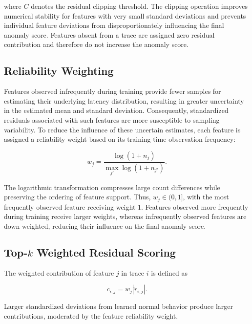 \documentclass[informatics,article,submit,moreauthors]{Definitions/mdpi}
\begin{document}
\noindent where \(C\) denotes the residual clipping threshold. The
clipping operation improves numerical stability for features with very
small standard deviations and prevents individual feature deviations from
disproportionately influencing the final anomaly score. Features absent
from a trace are assigned zero residual contribution and therefore do not
increase the anomaly score.

\subsection{Reliability Weighting}

Features observed infrequently during training provide fewer samples for
estimating their underlying latency distribution, resulting in greater
uncertainty in the estimated mean and standard deviation. Consequently,
standardized residuals associated with such features are more susceptible
to sampling variability. To reduce the influence of these uncertain
estimates, each feature is assigned a reliability weight based on its
training-time observation frequency:

\begin{equation}
	w_j
	=
	\frac{\log(1+n_j)}
	{\max_{j'} \log(1+n_{j'})}.
	\label{eq:weight}
\end{equation}

\noindent The logarithmic transformation compresses large count
differences while preserving the ordering of feature support. Thus,
\(w_j \in (0,1]\), with the most frequently observed feature receiving
weight \(1\). Features observed more frequently during training receive
larger weights, whereas infrequently observed features are down-weighted,
reducing their influence on the final anomaly score.

\subsection{Top-\(k\) Weighted Residual Scoring}

The weighted contribution of feature \(j\) in trace \(i\) is defined as

\begin{equation}
	c_{i,j}
	=
	w_j
	\left|
	\tilde{r}_{i,j}
	\right|.
	\label{eq:contribution}
\end{equation}

\noindent Larger standardized deviations from learned normal behavior
produce larger contributions, moderated by the feature reliability
weight.
\end{document}
